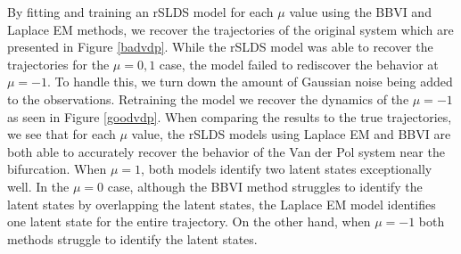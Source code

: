 By fitting and training an rSLDS model for each $\mu$ value using the BBVI and Laplace EM methods, we recover the trajectories of the original system which are presented in Figure \ref{badvdp}. While the rSLDS model was able to recover the trajectories for the $\mu=0,1$ case, the model failed to rediscover the behavior at $\mu = -1$. To handle this, we turn down the amount of Gaussian noise being added to the observations. Retraining the model we recover the dynamics of the $\mu = -1$ as seen in Figure \ref{goodvdp}. When comparing the results to the true trajectories, we see that for each $\mu$ value, the rSLDS models using Laplace EM and BBVI are both able to accurately recover the behavior of the Van der Pol system near the bifurcation. When $\mu = 1$, both models identify two latent states exceptionally well. In the $\mu = 0$ case, although the BBVI method struggles to identify the latent states by overlapping the latent states, the Laplace EM model identifies one latent state for the entire trajectory. On the other hand, when $\mu = -1$ both methods struggle to identify the latent states.

